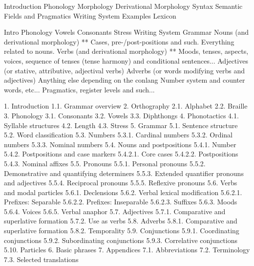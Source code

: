 Introduction
Phonology
Morphology
Derivational Morphology
Syntax
Semantic Fields and Pragmatics
Writing System
Examples
Lexicon



Intro
Phonology
Vowels
Consonants
Stress
Writing System
Grammar
Nouns (and derivational morphology)
** Cases, pre-/post-positions and such. Everything related to nouns.
Verbs (and derivational morphology)
** Moods, tenses, aspects, voices, sequence of tenses (tense harmony) and conditional sentences...
Adjectives (or stative, attributive, adjectival verbs)
Adverbs (or words modifying verbs and adjectives)
Anything else depending on the conlang
Number system and counter words, etc...
Pragmatics, register levels and such...



1.	Introduction
	1.1.	Grammar overview
2.	Orthography
	2.1.	Alphabet
	2.2.	Braille
3.	Phonology
	3.1.	Consonants
	3.2.	Vowels
	3.3.	Diphthongs
4.	Phonotactics
	4.1.	Syllable structures
	4.2.	Length
	4.3.	Stress
5.	Grammar
	5.1.	Sentence structure
	5.2.	Word classification
	5.3.	Numbers
		5.3.1.	Cardinal numbers
		5.3.2.	Ordinal numbers
		5.3.3.	Nominal numbers
	5.4.	Nouns and postpositions
		5.4.1.	Number
		5.4.2.	Postpositions and case markers
			5.4.2.1.	Core cases
			5.4.2.2.	Postpositions
		5.4.3.	Nominal affixes
	5.5.	Pronouns
		5.5.1.	Personal pronouns
		5.5.2.	Demonstrative and quantifying determiners
		5.5.3.	Extended quantifier pronouns and adjectives
		5.5.4.	Reciprocal pronouns
		5.5.5.	Reflexive pronouns
	5.6.	Verbs and modal particles
		5.6.1.	Declensions
		5.6.2.	Verbal lexical modification
			5.6.2.1.	Prefixes: Separable
			5.6.2.2.	Prefixes: Inseparable
			5.6.2.3.	Suffixes
		5.6.3.	Moods
		5.6.4.	Voices
		5.6.5.	Verbal anaphor
	5.7.	Adjectives
		5.7.1.	Comparative and superlative formation
		5.7.2.	Use as verbs
	5.8.	Adverbs
		5.8.1.	Comparative and superlative formation
		5.8.2.	Temporality
	5.9.	Conjunctions
		5.9.1.	Coordinating conjunctions
		5.9.2.	Subordinating conjunctions
		5.9.3.	Correlative conjunctions
	5.10.	Particles
6.	Basic phrases
7.	Appendices
	7.1.	Abbreviations
	7.2.	Terminology
	7.3.	Selected translations
 


